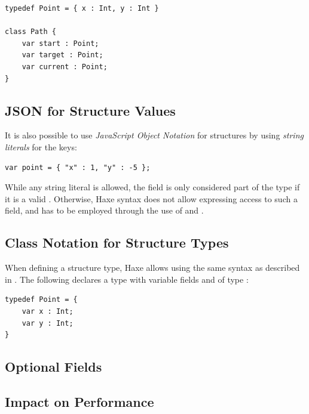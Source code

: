 \documentclass{haxe}
\begin{document}
\begin{lstlisting}
typedef Point = { x : Int, y : Int }

class Path {
    var start : Point;
    var target : Point;
    var current : Point;
}
\end{lstlisting}


\subsection{JSON for Structure Values}
\label{types-structure-json}

It is also possible to use \emph{JavaScript Object Notation} for structures by using \emph{string literals} for the keys:

\begin{lstlisting}
var point = { "x" : 1, "y" : -5 };
\end{lstlisting}
While any string literal is allowed, the field is only considered part of the type if it is a valid . Otherwise, Haxe syntax does not allow expressing access to such a field, and  has to be employed through the use of  and .

\subsection{Class Notation for Structure Types}
\label{types-structure-class-notation}

When defining a structure type, Haxe allows using the same syntax as described in . The following  declares a  type with variable fields  and  of type :

\begin{lstlisting}
typedef Point = {
    var x : Int;
    var y : Int;
}
\end{lstlisting}

\subsection{Optional Fields}
\label{types-structure-optional-fields}


\subsection{Impact on Performance}
\label{types-structure-performance}
\end{document}
